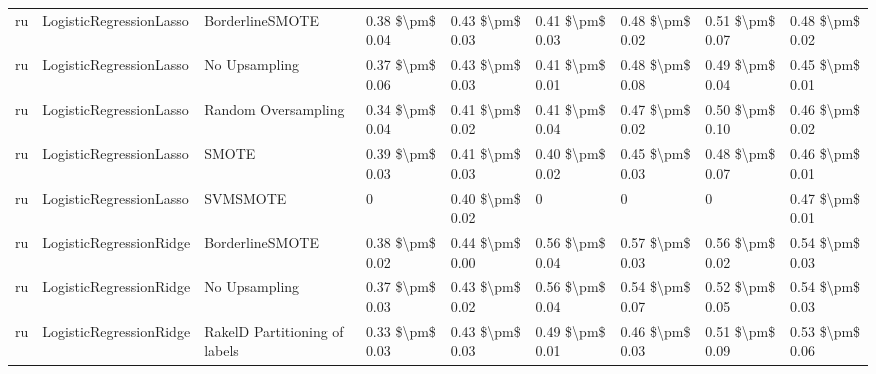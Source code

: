 \begin{tabular}{lllllllll}
      ru &         LogisticRegressionLasso &               BorderlineSMOTE & 0.38 \$\textbackslash pm\$ 0.04 &           0.43 \$\textbackslash pm\$ 0.03 &       0.41 \$\textbackslash pm\$ 0.03 &        0.48 \$\textbackslash pm\$ 0.02 &                         0.51 \$\textbackslash pm\$ 0.07 &     0.48 \$\textbackslash pm\$ 0.02 \\
      ru &         LogisticRegressionLasso &                 No Upsampling & 0.37 \$\textbackslash pm\$ 0.06 &           0.43 \$\textbackslash pm\$ 0.03 &       0.41 \$\textbackslash pm\$ 0.01 &        0.48 \$\textbackslash pm\$ 0.08 &                         0.49 \$\textbackslash pm\$ 0.04 &     0.45 \$\textbackslash pm\$ 0.01 \\
      ru &         LogisticRegressionLasso &           Random Oversampling & 0.34 \$\textbackslash pm\$ 0.04 &           0.41 \$\textbackslash pm\$ 0.02 &       0.41 \$\textbackslash pm\$ 0.04 &        0.47 \$\textbackslash pm\$ 0.02 &                         0.50 \$\textbackslash pm\$ 0.10 &     0.46 \$\textbackslash pm\$ 0.02 \\
      ru &         LogisticRegressionLasso &                         SMOTE & 0.39 \$\textbackslash pm\$ 0.03 &           0.41 \$\textbackslash pm\$ 0.03 &       0.40 \$\textbackslash pm\$ 0.02 &        0.45 \$\textbackslash pm\$ 0.03 &                         0.48 \$\textbackslash pm\$ 0.07 &     0.46 \$\textbackslash pm\$ 0.01 \\
      ru &         LogisticRegressionLasso &                      SVMSMOTE &               0 &           0.40 \$\textbackslash pm\$ 0.02 &                     0 &                      0 &                                       0 &     0.47 \$\textbackslash pm\$ 0.01 \\
      ru &         LogisticRegressionRidge &               BorderlineSMOTE & 0.38 \$\textbackslash pm\$ 0.02 &           0.44 \$\textbackslash pm\$ 0.00 &       0.56 \$\textbackslash pm\$ 0.04 &        0.57 \$\textbackslash pm\$ 0.03 &                         0.56 \$\textbackslash pm\$ 0.02 &     0.54 \$\textbackslash pm\$ 0.03 \\
      ru &         LogisticRegressionRidge &                 No Upsampling & 0.37 \$\textbackslash pm\$ 0.03 &           0.43 \$\textbackslash pm\$ 0.02 &       0.56 \$\textbackslash pm\$ 0.04 &        0.54 \$\textbackslash pm\$ 0.07 &                         0.52 \$\textbackslash pm\$ 0.05 &     0.54 \$\textbackslash pm\$ 0.03 \\
      ru &         LogisticRegressionRidge & RakelD Partitioning of labels & 0.33 \$\textbackslash pm\$ 0.03 &           0.43 \$\textbackslash pm\$ 0.03 &       0.49 \$\textbackslash pm\$ 0.01 &        0.46 \$\textbackslash pm\$ 0.03 &                         0.51 \$\textbackslash pm\$ 0.09 &     0.53 \$\textbackslash pm\$ 0.06 \\

\end{tabular}
